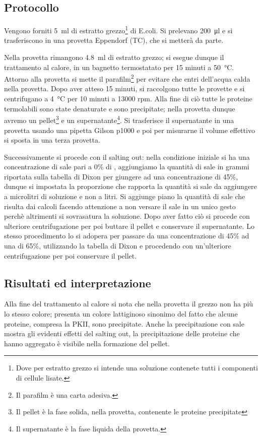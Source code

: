 \documentclass[twocolumn,a4paper,10pt]{my_report}
\begin{document}
{\subsection{Protocollo}
Vengono forniti \SI{5}{\ml} di estratto grezzo\footnote{Dove per estratto grezzo si intende una soluzione contenete tutti i componenti di cellule lisate.} di E.coli. Si prelevano \SI{200}{\ul} e si trasferiscono in una provetta Eppendorf (TC), che si metterà da parte.

Nella provetta rimangono \SI{4,8}{\ml} di estratto grezzo; si esegue dunque il trattamento al calore, in un bagnetto termostatato per 15 minuti a \SI{50}{\celsius}. Attorno alla provetta si mette il parafilm\footnote{Il parafilm è una carta adesiva.} per evitare che entri dell'acqua calda nella provetta.
Dopo aver atteso 15 minuti, si raccolgono tutte le provette e si centrifugano a \SI{4}{\celsius} per 10 minuti a 13000 rpm. Alla fine di ciò tutte le proteine termolabili sono state denaturate e sono precipitate; nella provetta dunque avremo un pellet\footnote{ Il pellet è la fase solida, nella provetta, contenente le proteine precipitate} e un supernatante\footnote{Il supernatante è la fase liquida della provetta.}. Si trasferisce il supernatante in una provetta usando una pipetta Gilson p1000 e poi per misurarne il volume effettivo si sposta in una terza provetta.

Successivamente si procede con il salting out: nella condizione iniziale si ha una concentrazione di sale pari a 0\% di , aggiungiamo la quantità di sale in grammi riportata sulla tabella di Dixon per giungere ad una concentrazione di 45\%, dunque si impostata la proporzione che rapporta la quantità si sale da aggiungere a microlitri di soluzione e non a litri.
Si aggiunge piano la quantità di sale che risulta dai calcoli facendo attenzione a non versare il sale in un unico gesto perchè altrimenti si sovrasatura la soluzione.
Dopo aver fatto ciò si procede con ulteriore centrifugazione per poi buttare il pellet e conservare il supernatante.
Lo stesso procedimento lo si adopera per passare da una concentrazione di 45\% ad una di 65\%, utilizzando la tabella di Dixon e procedendo con un'ulteriore centrifugazione per poi conservare il pellet.

\subsection{Risultati ed interpretazione}
Alla fine del trattamento al calore si nota che nella provetta il grezzo non ha più lo stesso colore; presenta un colore lattiginoso sinonimo del fatto che alcune proteine, compresa la PKII, sono precipitate.
Anche la precipitazione con sale mostra gli evidenti effetti del salting out, la precipitazione delle proteine che hanno aggregato è visibile nella formazione del pellet.

}
\end{document}

